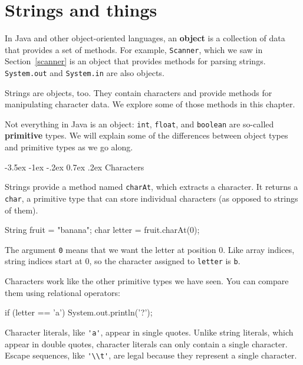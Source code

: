 \documentclass[12pt]{book}
\makeatletter
\theoremstyle{exercise}
\newcommand{\java}[1]{\verb"#1"}
\renewcommand{\section}{\@startsection{section}{1}{\z@}%
    {-3.5ex \@plus -1ex \@minus -.2ex}%
    {0.7ex \@plus.2ex}%
    {\normalfont\Large\bfseries}}
\newcommand{\java}[1]{\lstinline{#1}} %
\makeatother
\begin{document}
\chapter{Strings and things}
\label{strings}


In Java and other object-oriented languages, an {\bf object} is a collection of data that provides a set of methods.
For example, \java{Scanner}, which we saw in Section~\ref{scanner} is an object that provides methods for parsing strings.
\java{System.out} and \java{System.in} are also objects.

Strings are objects, too.
They contain characters and provide methods for manipulating character data.
We explore some of those methods in this chapter.

Not everything in Java is an object: \java{int}, \java{float}, and \java{boolean} are so-called {\bf primitive} types.
We will explain some of the differences between object types and primitive types as we go along.


\section{Characters}


Strings provide a method named \java{charAt}, which extracts a character.
It returns a \java{char}, a primitive type that can store individual characters (as opposed to strings of them).

\begin{code}
    String fruit = "banana";
    char letter = fruit.charAt(0);
\end{code}

The argument \java{0} means that we want the letter at position 0.
Like array indices, string indices start at 0, so the character assigned to \java{letter} is \java{b}.


Characters work like the other primitive types we have seen.
You can compare them using relational operators:

\begin{code}
    if (letter == 'a') {
        System.out.println('?');
    }
\end{code}

Character literals, like \java{'a'}, appear in single quotes.
Unlike string literals, which appear in double quotes, character literals can only contain a single character.
Escape sequences, like \java{'\\t'}, are legal because they represent a single character.
\end{document}
